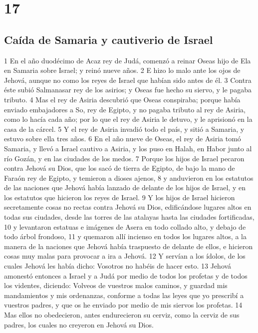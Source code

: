 \chapter{17}

\section*{Caída de Samaria y cautiverio de Israel}


1 En el año duodécimo de Acaz rey de Judá, comenzó a reinar Oseas hijo de Ela en Samaria sobre Israel; y reinó nueve años.
2 E hizo lo malo ante los ojos de Jehová, aunque no como los reyes de Israel que habían sido antes de él.
3 Contra éste subió Salmanasar rey de los asirios; y Oseas fue hecho su siervo, y le pagaba tributo.
4 Mas el rey de Asiria descubrió que Oseas conspiraba; porque había enviado embajadores a So, rey de Egipto, y no pagaba tributo al rey de Asiria, como lo hacía cada año; por lo que el rey de Asiria le detuvo, y le aprisionó en la casa de la cárcel.
5 Y el rey de Asiria invadió todo el país, y sitió a Samaria, y estuvo sobre ella tres años.
6 En el año nueve de Oseas, el rey de Asiria tomó Samaria, y llevó a Israel cautivo a Asiria, y los puso en Halah, en Habor junto al río Gozán, y en las ciudades de los medos.
7 Porque los hijos de Israel pecaron contra Jehová su Dios, que los sacó de tierra de Egipto, de bajo la mano de Faraón rey de Egipto, y temieron a dioses ajenos,
8 y anduvieron en los estatutos de las naciones que Jehová había lanzado de delante de los hijos de Israel, y en los estatutos que hicieron los reyes de Israel.
9 Y los hijos de Israel hicieron secretamente cosas no rectas contra Jehová su Dios, edificándose lugares altos en todas sus ciudades, desde las torres de las atalayas hasta las ciudades fortificadas,
10 y levantaron estatuas e imágenes de Asera en todo collado alto, y debajo de todo árbol frondoso, 
11 y quemaron allí incienso en todos los lugares altos, a la manera de la naciones que Jehová había traspuesto de delante de ellos, e hicieron cosas muy malas para provocar a ira a Jehová.
12 Y servían a los ídolos, de los cuales Jehová les había dicho: Vosotros no habéis de hacer esto.
13 Jehová amonestó entonces a Israel y a Judá por medio de todos los profetas y de todos los videntes, diciendo: Volveos de vuestros malos caminos, y guardad mis mandamientos y mis ordenanzas, conforme a todas las leyes que yo prescribí a vuestros padres, y que os he enviado por medio de mis siervos los profetas.
14 Mas ellos no obedecieron, antes endurecieron su cerviz, como la cerviz de sus padres, los cuales no creyeron en Jehová su Dios.
